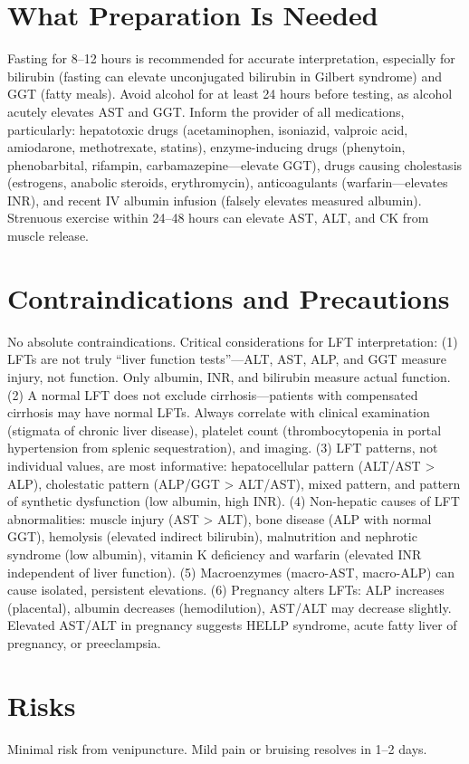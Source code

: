 \section*{What Preparation Is Needed}
Fasting for 8--12 hours is recommended for accurate interpretation, especially for bilirubin (fasting can elevate unconjugated bilirubin in Gilbert syndrome) and GGT (fatty meals). Avoid alcohol for at least 24 hours before testing, as alcohol acutely elevates AST and GGT. Inform the provider of all medications, particularly: hepatotoxic drugs (acetaminophen, isoniazid, valproic acid, amiodarone, methotrexate, statins), enzyme-inducing drugs (phenytoin, phenobarbital, rifampin, carbamazepine---elevate GGT), drugs causing cholestasis (estrogens, anabolic steroids, erythromycin), anticoagulants (warfarin---elevates INR), and recent IV albumin infusion (falsely elevates measured albumin). Strenuous exercise within 24--48 hours can elevate AST, ALT, and CK from muscle release.

\section*{Contraindications and Precautions}
No absolute contraindications. Critical considerations for LFT interpretation: (1) LFTs are not truly ``liver function tests''---ALT, AST, ALP, and GGT measure injury, not function. Only albumin, INR, and bilirubin measure actual function. (2) A normal LFT does not exclude cirrhosis---patients with compensated cirrhosis may have normal LFTs. Always correlate with clinical examination (stigmata of chronic liver disease), platelet count (thrombocytopenia in portal hypertension from splenic sequestration), and imaging. (3) LFT patterns, not individual values, are most informative: hepatocellular pattern (ALT/AST > ALP), cholestatic pattern (ALP/GGT > ALT/AST), mixed pattern, and pattern of synthetic dysfunction (low albumin, high INR). (4) Non-hepatic causes of LFT abnormalities: muscle injury (AST > ALT), bone disease (ALP with normal GGT), hemolysis (elevated indirect bilirubin), malnutrition and nephrotic syndrome (low albumin), vitamin K deficiency and warfarin (elevated INR independent of liver function). (5) Macroenzymes (macro-AST, macro-ALP) can cause isolated, persistent elevations. (6) Pregnancy alters LFTs: ALP increases (placental), albumin decreases (hemodilution), AST/ALT may decrease slightly. Elevated AST/ALT in pregnancy suggests HELLP syndrome, acute fatty liver of pregnancy, or preeclampsia.

\section*{Risks}
Minimal risk from venipuncture. Mild pain or bruising resolves in 1--2 days.

